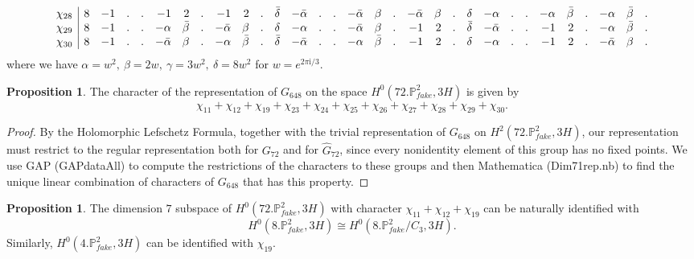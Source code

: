 \documentclass[11pt,reqno]{amsart}
\def\ii {{\mathrm i}}
\def\P {{\mathbb P}}
\def\FPP {{\P^2_{fake}}}
\theoremstyle{definition}
\newtheorem{proposition}[theorem]{Proposition}
\numberwithin{equation}{section}
\begin{document}
$$\begin{array}{l | rrrrrrrrrrrrrrrrrrrrrrrrrrrrrr}
\chi_{28}&     8& -1&  .&  .&  -1&   2&  .&  -1&   2&  .& \bar\delta& -\bar\alpha&   .&   .& -\bar\alpha&   \beta&  .& -\bar\alpha&   \beta&  .&  \delta&  -\alpha&   .&   .&  -\alpha&  \bar\beta&  .&  -\alpha&  \bar\beta&  .\\
\chi_{29} &    8& -1&  .&  .&  -\alpha&  \bar\beta&  .& -\bar\alpha&   \beta&  .&  \delta&  -\alpha&   .&   .& -\bar\alpha&   \beta&  .&  -1&   2&  .& \bar\delta& -\bar\alpha&   .&   .&  -1&   2&  .&  -\alpha&  \bar\beta&  .\\
\chi_{30} &    8& -1&  .&  .& -\bar\alpha&   \beta&  .&  -\alpha&  \bar\beta&  .& \bar\delta& -\bar\alpha&   .&   .&  -\alpha&  \bar\beta&  .&  -1&   2&  .&  \delta&  -\alpha&   .&   .&  -1&   2&  .& -\bar\alpha&   \beta&  .\\
\end{array}
$$
where we have 
$\alpha = w^2,~
\beta 
  = 2w ,~
\gamma 
  = 3w^2,~
\delta 
  =  8 w^2
$ for $w=e^{2\pi\ii/3}$.


\begin{proposition}\label{weights71}
The character of the representation of  $G_{648}$ on  the space $H^0(72.\FPP,3H)$ is given by 
\begin{equation}\label{char71}
\chi_{11}+\chi_{12}+\chi_{19} + \chi_{23} +  \chi_{24} +  \chi_{25} +  \chi_{26} + 
 \chi_{27} +  \chi_{28} +  \chi_{29} +  \chi_{30}.
\end{equation}
\end{proposition}

\begin{proof}
By the Holomorphic Lefschetz Formula, together with the trivial representation of  $G_{648}$ on $H^2(72.\FPP,3H)$, our representation must restrict to the regular representation both for $G_{72}$ and for $\widehat G_{72}$, since every nonidentity element of this group has no fixed points. We use GAP (GAPdataAll) to compute the restrictions 
of the characters to these groups and then Mathematica (Dim71rep.nb) to find the unique linear combination of characters of $G_{648}$ that has this property.
\end{proof}

\begin{proposition}\label{weights7}
The dimension $7$ subspace of $H^0(72.\FPP,3H)$ with character $\chi_{11}+\chi_{12}+\chi_{19}$ can be naturally identified with 
$$H^0(8.\FPP,3H) \cong H^0(8.\FPP/C_3,3H).$$ Similarly, $H^0(4.\FPP,3H)$ can be identified with $\chi_{19}$. 
\end{proposition}
\end{document}

